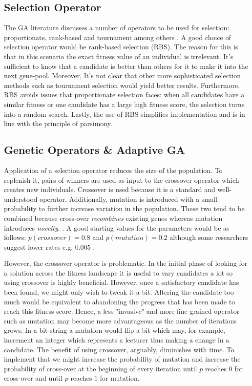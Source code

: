 \documentclass[a4paper, 12pt, titlepage]{article}
\begin{document}
\subsection*{Selection Operator}

The GA literature discusses a number of operators to be used for
selection: proportionate, rank-based and tournament among others
\cite{floreano2008, eberhart2007, heaton2014}.  A good choice of selection
operator would be rank-based selection (RBS). The reason for this is that
in this scenario the exact fitness value of an individual is irrelevant.
It's sufficient to know that a candidate is better than others for it
to make it into the next gene-pool.  Moreover, It's not clear that other
more sophisticated selection methods such as tournament selection would
yield better results. Furthermore, RBS avoids issues that proportionate
selection faces: when all candidates have a similar fitness or one
candidate has a large high fitness score, the selection turns into a
random search.  \cite[p.~23]{floreano2008} Lastly, the use of RBS simplifies
implementation and is in line with the principle of parsimony.

\subsection*{Genetic Operators \& Adaptive GA}

Application of a selection operator reduces the size of the population. To
replenish it, pairs of winners are used as input to the crossover operator which creates
new individuals.  Crossover is used because it is a standard and
well-understood operator. Additionally, mutation is introduced with
a small probability to further increase variation in the population.
These two tend to be combined because cross-over \emph{recombines} existing
genes whereas mutation introduces \emph{novelty}.  \cite[p.~27]{heaton2014}.
A good starting values for the parameters would be as follows:
\(p(crossover) = 0.8\) \cite[p.~117]{eberhart2007} and \(p(mutation) =
0.2\) \cite[p.~25]{heaton2014} although some researchers suggest lower
rates e.g. \(0.005\) \cite[p.~117]{eberhart2007}.

However, the crossover operator is problematic. In the initial phase
of looking for a solution across the fitness landscape it is useful to
vary candidates a lot so using crossover is highly beneficial. However,
once a satisfactory candidate has been found, we might only wish to
tweak it a bit. Altering the candidate too much would be equivalent
to abandoning the progress that has been made to reach this fitness
score. Hence, a less "invasive" and more fine-grained operator such
as mutation \cite[p.~28]{floreano2008} may become more advantageous as
the number of iterations grows.  In a bit-string a mutation would flip
a bit which may, for example, increment an integer which represents
a lecturer thus making a change in a candidate.  The benefit of using
crossover, arguably, diminishes with time. To implement that we might
increase the probability of mutation and increase the probability of cross-over 
at the beginning of every iteration until \(p\) reaches \(0\) for cross-over
and until \(p\) reaches \(1\) for mutation.
\end{document}
